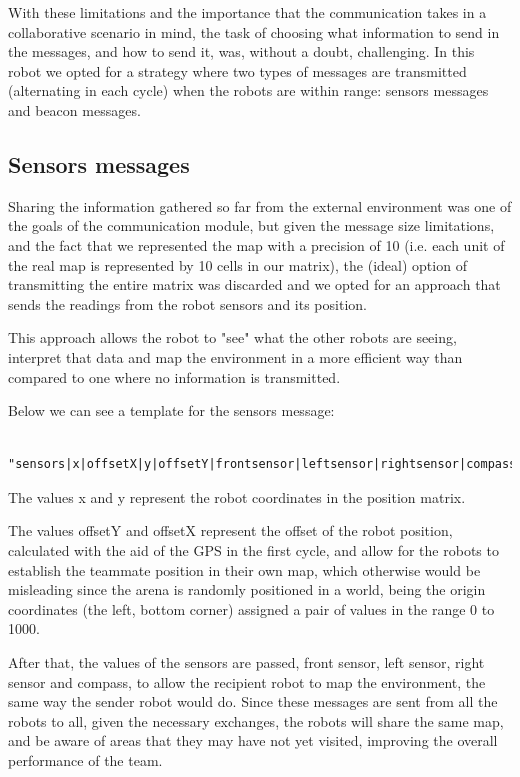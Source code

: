 \documentclass[oribibl]{llncs}
\begin{document}
With these limitations and the importance that the communication takes in a collaborative scenario in mind, the task of choosing what information to send in the messages, and how to send it, was, without a doubt, challenging. In this robot we opted for a strategy where two types of messages are transmitted (alternating in each cycle) when the robots are within range: sensors messages and beacon messages.

\subsection{Sensors messages}

Sharing the information gathered so far from the external environment was one of the goals of the communication module, but given the message size limitations, and the fact that we represented the map with a precision of 10 (i.e. each unit of the real map is represented by 10 cells in our matrix), the (ideal) option of transmitting the entire matrix was discarded and we opted for an approach that sends the readings from the robot sensors and its position.

This approach allows the robot to "see" what the other robots are seeing, interpret that data  and map the environment in a more efficient way than compared to one where no information is transmitted.

Below we can see a template for the sensors message:

\begin{verbatim}

"sensors|x|offsetX|y|offsetY|frontsensor|leftsensor|rightsensor|compass"

\end{verbatim}

The values x and y represent the robot coordinates in the position matrix.

The values offsetY and offsetX represent the offset of the robot position, calculated with the aid of the GPS in the first cycle, and allow for the robots to establish the teammate position in their own map, which otherwise would be misleading since the arena is randomly positioned in a world, being the origin coordinates (the left, bottom corner) assigned a pair of values in the range 0 to 1000.

After that, the values of the sensors are passed, front sensor, left sensor, right sensor and compass, to allow the recipient robot to map the environment, the same way the sender robot would do.
Since these messages are sent from all the robots to all, given the necessary exchanges, the robots will share the same map, and be aware of areas that they may have not yet visited, improving the overall performance of the team.
\end{document}
